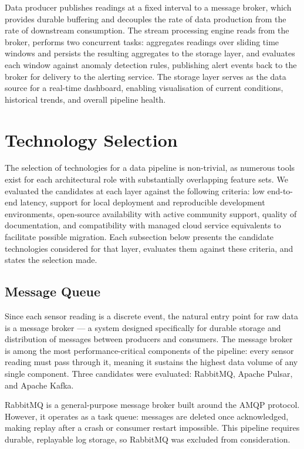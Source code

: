Data producer publishes readings at a fixed interval to a message broker, which provides durable buffering and decouples the rate of data production from the rate of downstream consumption. The stream processing engine reads from the broker, performs two concurrent tasks: aggregates readings over sliding time windows and persists the resulting aggregates to the storage layer, and evaluates each window against anomaly detection rules, publishing alert events back to the broker for delivery to the alerting service. The storage layer serves as the data source for a real-time dashboard, enabling visualisation of current conditions, historical trends, and overall pipeline health.

\section{Technology Selection}

The selection of technologies for a data pipeline is non-trivial, as numerous tools exist for each architectural role with substantially overlapping feature sets. We evaluated the candidates at each layer  against the following criteria: low end-to-end latency, support for local deployment and reproducible development environments, open-source availability with active community support, quality of documentation, and compatibility with managed cloud service equivalents to facilitate possible migration.
Each subsection below presents the candidate technologies considered for that layer, evaluates them against these criteria, and states the selection made.

\subsection{Message Queue}

Since each sensor reading is a discrete event, the natural entry point for raw data is a message broker — a system designed specifically for durable storage and distribution of messages between producers and consumers. The message broker is among the most performance-critical components of the pipeline: every sensor reading must pass through it, meaning it sustains the highest data volume of any single component. Three candidates were evaluated: RabbitMQ, Apache Pulsar, and Apache Kafka.

RabbitMQ is a general-purpose message broker built around the AMQP protocol. However, it operates as a task queue: messages are deleted once acknowledged, making replay after a crash or consumer restart impossible. This pipeline requires durable, replayable log storage, so RabbitMQ was excluded from consideration.

